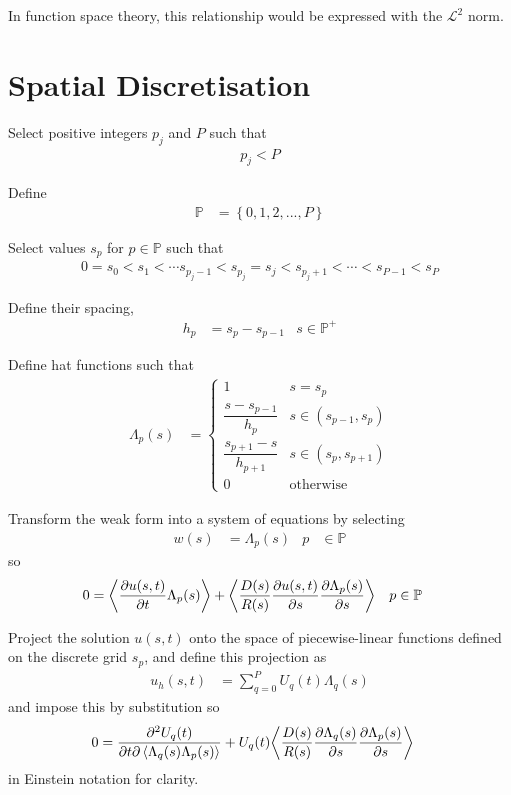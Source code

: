 \documentclass{report}
\newcommand\Brace[1]{{ \left\{{#1}\right\} }}
\newcommand\Angle[1]{{ \left\langle{#1}\right\rangle }}
\newcommand\bbP{{ \mathbb{P} }}
\begin{document}
In function space theory, this relationship would be expressed with the $\mathcal{L}^2$ norm.

\section{Spatial Discretisation}
Select positive integers $p_j$ and $P$ such that
\begin{align*}
	p_j < P
\end{align*}

Define
\begin{align*}
	\bbP &= \Brace{0, 1, 2, ..., P}
\end{align*}

Select values $s_p$ for $p \in \bbP$ such that
\begin{align*}
	0 = s_0 < s_1 < \cdots s_{p_j - 1} < s_{p_j} = s_j < s_{p_j + 1} < \cdots < s_{P - 1} < s_P
\end{align*}

Define their spacing,
\begin{align*}
	h_p &= s_p - s_{p-1} & s \in \bbP^+
\end{align*}

Define hat functions such that
\begin{align*}
	\Lambda_p(s) &= \begin{cases}
		1 & s = s_p \\
		\dfrac{s - s_{p-1}}{h_p} & s \in (s_{p-1}, s_p) \\
		\dfrac{s_{p+1} - s}{h_{p+1}} & s \in (s_p, s_{p+1}) \\
		0 & \text{otherwise}
	\end{cases}
\end{align*}

Transform the weak form into a system of equations by selecting
\begin{align*}
	w(s) &= \Lambda_p(s) & p &\in \bbP
\end{align*}
so
\begin{align*}
	0 &= \Angle{\pdv{u(s, t)}{t} \Lambda_p(s)} + \Angle{\frac{D(s)}{R(s)} \pdv{u(s, t)}{s} \pdv{\Lambda_p(s)}{s}} & p &\in \bbP
\end{align*}

Project the solution $u(s, t)$ onto the space of piecewise-linear functions defined on the discrete grid $s_p$, and define this projection as
\begin{align*}
	u_h(s, t) &= \sum_{q = 0}^P U_q(t) \Lambda_q(s)
\end{align*}
and impose this by substitution so
\begin{align*}
	0 &= \pdv{U_q(t)}{t} \Angle{\Lambda_q(s) \Lambda_p(s)} + U_q(t) \Angle{\frac{D(s)}{R(s)} \pdv{\Lambda_q(s)}{s} \pdv{\Lambda_p(s)}{s}}
\end{align*}
in Einstein notation for clarity.
\end{document}

